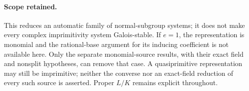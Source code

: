 \paragraph{Scope retained.}
This reduces an automatic family of normal-subgroup systems; it
does not make every complex imprimitivity system Galois-stable.
If \(e=1\), the representation is monomial and the rational-base
argument for its inducing coefficient is not available here.
Only the separate monomial-source results, with their exact field
and nonsplit hypotheses, can remove that case.
A quasiprimitive representation may still be imprimitive; neither
the converse nor an exact-field reduction of every such source
is asserted. Proper \(L/K\) remains explicit throughout.
